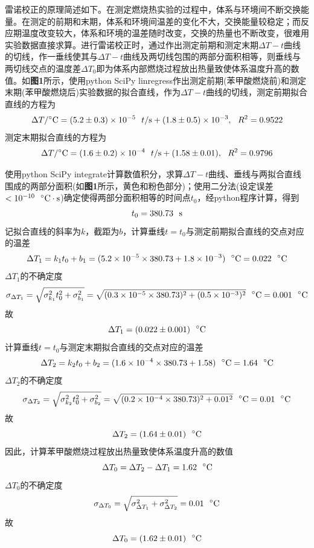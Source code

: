 \documentclass[12pt]{article}
\begin{document}
雷诺校正的原理简述如下。在测定燃烧热实验的过程中，体系与环境间不断交换能量。在测定的前期和末期，体系和环境间温差的变化不大，交换能量较稳定；而反应期温度改变较大，体系和环境的温差随时改变，交换的热量也不断改变，很难用实验数据直接求算。进行雷诺校正时，通过作出测定前期和测定末期$\Delta T-t$曲线的切线，作一垂线使其与$\Delta T-t$曲线及两切线包围的两部分面积相等，则垂线与两切线交点的温度差$\Delta T_{0}$即为体系内部燃烧过程放出热量致使体系温度升高的数值。如\textbf{图1}所示，使用python SciPy linregress作出测定前期(苯甲酸燃烧前)和测定末期(苯甲酸燃烧后)实验数据的拟合直线，作为$\Delta T-t$曲线的切线，测定前期拟合直线的方程为
$$
\Delta T/{\rm ^{\circ}C} =(5.2\pm 0.3)\times 10^{-5} \ \ t/{\rm s}+(1.8\pm 0.5)\times 10^{-3},\  \ R^{2}=0.9522
$$
测定末期拟合直线的方程为
$$
\Delta T/{\rm ^{\circ}C} =(1.6\pm 0.2)\times 10^{-4} \ \ t/{\rm s}+(1.58\pm 0.01),\  \ R^{2}=0.9796
$$
\par 
使用python SciPy integrate计算数值积分，求算$\Delta T-t$曲线、垂线与两拟合直线围成的两部分面积(如\textbf{图1}所示，黄色和粉色部分)；使用二分法(设定误差$<10^{-10} \ \ {\rm ^{\circ}C\cdot s}$)确定使得两部分面积相等的时间点$t_{0}$，经python程序计算，得到
$$
t_{0}=380.73\ \ {\rm s}
$$
记拟合直线的斜率为$k$，截距为$b$，计算垂线$t=t_{0}$与测定前期拟合直线的交点对应的温差
$$
\Delta T_{1}=k_{1}t_{0}+b_{1}=(5.2\times 10^{-5} \times 380.73+1.8\times 10^{-3})\ \ {\rm ^{\circ}C}=0.022\ \ {\rm ^{\circ}C}
$$
$\Delta T_{1}$的不确定度
$$
\sigma_{\Delta T_{1}}=\sqrt{\sigma^{2}_{k_{1}}t^{2}_{0}+\sigma^{2}_{b_{1}}}=\sqrt{(0.3\times 10^{-5} \times 380.73)^{2}+(0.5\times 10^{-3})^{2}} \ \ {\rm ^{\circ}C}=0.001\ \ {\rm ^{\circ}C}
$$
故
$$\Delta T_{1}=(0.022\pm 0.001)\ \ {\rm ^{\circ}C}
$$
计算垂线$t=t_{0}$与测定末期拟合直线的交点对应的温差
$$
\Delta T_{2}=k_{2}t_{0}+b_{2}=(1.6\times 10^{-4} \times 380.73+1.58)\ \ {\rm ^{\circ}C}=1.64\ \ {\rm ^{\circ}C}
$$
$\Delta T_{2}$的不确定度
$$
\sigma_{\Delta T_{2}}=\sqrt{\sigma^{2}_{k_{2}}t^{2}_{0}+\sigma^{2}_{b_{2}}}=\sqrt{(0.2\times 10^{-4} \times 380.73)^{2}+0.01^{2}} \ \ {\rm ^{\circ}C}=0.01\ \ {\rm ^{\circ}C}
$$
故
$$\Delta T_{2}=(1.64\pm 0.01)\ \ {\rm ^{\circ}C}
$$
因此，计算苯甲酸燃烧过程放出热量致使体系温度升高的数值
$$
\Delta T_{0}=\Delta T_{2}-\Delta T_{1}=1.62\ \ {\rm ^{\circ}C}
$$
$\Delta T_{0}$的不确定度
$$
\sigma_{\Delta T_{0}}=\sqrt{\sigma^{2}_{\Delta T_{1}}+\sigma^{2}_{\Delta T_{2}}}=0.01\ \ {\rm ^{\circ}C}
$$
故
$$
\Delta T_{0}=(1.62\pm 0.01)\ \ {\rm ^{\circ}C}
$$
\end{document}
